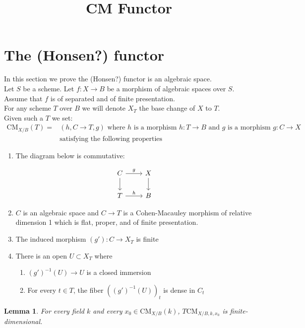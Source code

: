 \documentclass{article}
\title{
    \textmd{\textbf{CM Functor}}\\
}
\author{}
\date{}
\newtheorem{lemma}[theorem]{Lemma}
\theoremstyle{definition}
\theoremstyle{theorem}
\theoremstyle{remark}
\theoremstyle{definition}
\newcommand{\CMfunctor}{\text{CM}}
\begin{document}
\maketitle

\section{The (Honsen?) functor}
\label{section-cm}

\noindent
In this section we prove the (Honsen?) functor is an algebraic space.\\

Let $S$ be a scheme. Let $f : X \to B$ be a morphism of
algebraic spaces over $S$. Assume that $f$ is of separated and of finite presentation.\\

For any scheme $T$ over $B$ we will denote $X_T$ the base change of $X$ to $T$.\\

Given such a $T$ we set:
\begin{align*}
\CMfunctor_{X/B}(T) = & (h, C \to T, g)  \text{ where } 
h \text{ is a morphism } h : T \to B \text{ and } g \text{ is a morphism } g : C \to X \\ & \text{satisfying the following properties}
\end{align*}
\begin{enumerate}
\item The diagram below is commutative: 

\[ \begin{tikzcd}
C \arrow{r}{g} \arrow{d} & X \arrow{d} \\%
T \arrow{r}{h}& B
\end{tikzcd}
\]

\item $C$ is an algebraic space and $C \to T$ is a Cohen-Macauley morphism of relative dimension 1 which is flat, proper, and of finite presentation.
\item The induced morphism $(g') : C \to X_T$ is finite
\item There is an open $U \subset X_T$ where
\begin{enumerate}
\item $(g')^{-1}(U) \to U$ is a closed immersion
\item For every $t \in T$, the fiber $\left((g')^{-1}(U)\right)_t$ is dense in $C_t$
\end{enumerate}
\end{enumerate}

\begin{lemma}
	For every field $k$ and every $x_0\in \CMfunctor_{X/B}(k)$, $T\CMfunctor_{X/B,k,x_0}$ is finite-dimensional.
	\label{lem:axiom3}
\end{lemma}
\end{document}
